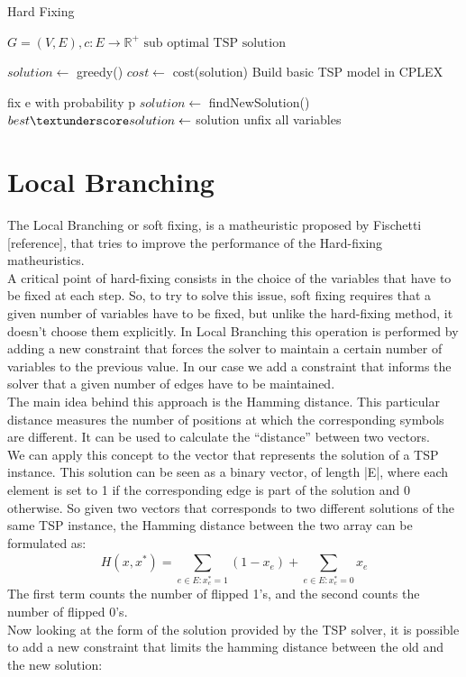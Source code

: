 \begin{algorithm}
    \caption{Hard Fixing}\label{algo:HardFixing}
    \begin{algorithmic}[1]
    \Require $G = (V,E), c:E \to \mathbb{R}^+$
    \Ensure $\text{sub optimal TSP solution}$

    \State $solution \gets$ greedy()
    \State $cost \gets $ cost(solution)
    \State Build basic TSP model in CPLEX



    \State fix e with probability p
    \EndFor
    \State $solution \gets$ findNewSolution()
    \State $ best\textunderscore solution \gets$ solution
    \EndIf
    \State unfix all variables
    \EndWhile

    \end{algorithmic}
\end{algorithm}

\section{Local Branching}

The Local Branching or soft fixing, is a matheuristic proposed by Fischetti [reference], that tries to improve the performance of the Hard-fixing matheuristics.\\
A critical point of hard-fixing consists in the choice of the variables that have to be fixed at each step. So, to try to solve this issue, soft fixing requires that a given number of variables have to be fixed, but unlike the hard-fixing method, it doesn’t choose them explicitly. In Local Branching this operation is performed by adding a new constraint that forces the solver to maintain a certain number of variables to the previous value. In our case we add a constraint that informs the solver that a given number of edges have to be maintained. \\
The main idea behind this approach is the Hamming distance. This particular distance measures the number of positions at which the corresponding symbols are different. It can be used to calculate the “distance” between two vectors. \\
We can apply this concept to the vector that represents the solution of a TSP instance. This solution can be seen as a binary vector, of length |E|, where each element is set to 1 if the corresponding edge is part of the solution and 0 otherwise. So given two vectors that corresponds to two different solutions of the same TSP instance, the Hamming distance between the two array can be formulated as:
\begin{equation}
   H(x,x^*)= \sum_{e\in E: x_e^*=1}^{}(1-x_e) + \sum_{e\in E: x_e^*=0}^{}x_e
\end{equation}
The first term counts the number of flipped 1’s, and the second counts the number of flipped 0’s. \\
Now looking at the form of the solution provided by the TSP solver, it is possible to add a new constraint that limits the hamming distance between the old and the new solution:

